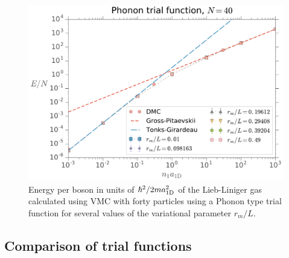 %
\begin{figure}[h!]
  \centering
  \includegraphics[width=0.75\linewidth]{./figures/phonon_energy-as-n-a1d_rm-var_Nb-40}
  \caption{ Energy per boson in units of $\hbar^2 / 2 m a_{ \mathrm{1D} }^2$ of the
    Lieb-Liniger gas calculated using VMC with forty particles using a Phonon
    type trial function for several values of the variational parameter $r_m /
      L$. }
  \label{fig:phonon-energy-as-n-a1d-rm-var-nb-40}
\end{figure}



\subsection{Comparison of trial functions}


